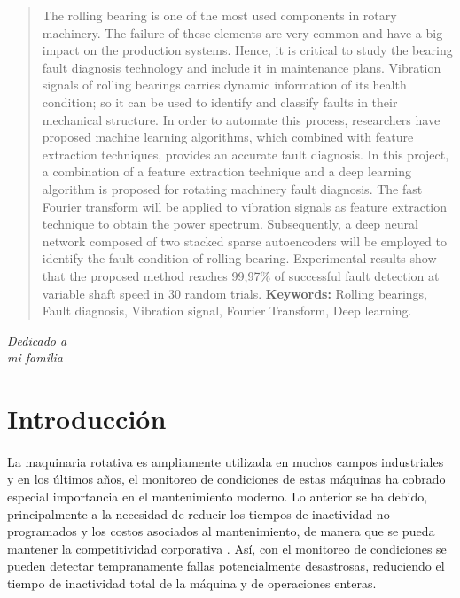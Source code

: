 \documentclass[a4paper,12pt]{article}
\begin{document}
\begin{abstract}
\normalsize
\noindent The rolling bearing is one of the most used components in rotary machinery. The failure of these elements are very common and have a big impact on the production systems. Hence, it is critical to study the bearing fault diagnosis technology and include it in maintenance plans. Vibration signals of rolling bearings carries dynamic information of its health condition; so it can be used to identify and classify faults in their mechanical structure. In order to automate this process, researchers have proposed machine learning algorithms, which combined with feature extraction techniques, provides an accurate fault diagnosis. In this project, a combination of a feature extraction technique and a deep learning algorithm is proposed for rotating machinery fault diagnosis. The fast Fourier transform will be applied to vibration signals as feature extraction technique to obtain the power spectrum. Subsequently, a deep neural network composed of two stacked sparse autoencoders will be employed to identify the fault condition of rolling bearing. Experimental results show that the proposed method reaches 99,97\% of successful fault detection at variable shaft speed in 30 random trials. 
\newline
\newline
\textbf{Keywords:} Rolling bearings, Fault diagnosis, Vibration signal, Fourier Transform, Deep learning.
\end{abstract}


\newpage
\begin{flushright}
\textit{Dedicado a \\
mi familia}
\end{flushright}

\newpage
\tableofcontents
\newpage

\renewcommand{\listfigurename}{Lista de Figuras}
\listoffigures
\listoftables
\newpage

\section{Introducción}

\paragraph{}
La maquinaria rotativa es ampliamente utilizada en muchos campos industriales y en los últimos años, el monitoreo de condiciones de estas máquinas ha cobrado especial importancia en el mantenimiento moderno. Lo anterior se ha debido, principalmente a la necesidad de reducir los tiempos de inactividad no programados y los costos asociados al mantenimiento, de manera que se pueda mantener la competitividad corporativa \cite{seeraa}. Así, con el monitoreo de condiciones se pueden detectar tempranamente fallas potencialmente desastrosas, reduciendo el tiempo de inactividad total de la máquina y de operaciones enteras.
\end{document}
